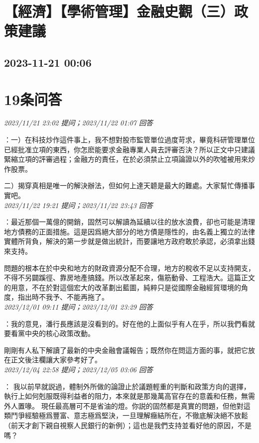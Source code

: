 \documentclass[twocolumn]{ctexart}
\begin{document}
\section{【經濟】【學術管理】金融史觀（三）政策建議}
\subsection{2023-11-21 00:06}


\section{19条问答}

\textit{\hfill\noindent\small 2023/11/21 23:02 提问；2023/11/22 01:07 回答}

：一）在科技炒作這件事上，我不想對股市監管單位過度苛求，畢竟科研管理單位已經批准立項的東西，你怎麽能要求金融專業人員去評審否決？所以正文中只建議緊縮立項的評審過程；金融方的責任，在於必須禁止立項論證以外的吹噓被用來炒作股票。

二）揭穿真相是唯一的解決辦法，但如何上達天聼是最大的難處。大家幫忙傳播事實吧。
\\

\textit{\hfill\noindent\small 2023/11/22 19:21 提问；2023/11/22 23:43 回答}

：最近那個一萬億的開銷，固然可以解讀為延續以往的放水浪費，卻也可能是清理地方債務的正面措施。這是因爲絕大部分的地方債是隱性的，由名義上獨立的法律實體所背負，解決的第一步就是做出統計，而要讓地方政府敢於承認，必須拿出錢來支持。

問題的根本在於中央和地方的財政資源分配不合理，地方的稅收不足以支持開支，不得不另闢蹊徑、靠房地產搞錢。所以改革起來，傷筋動骨、工程浩大。這篇正文的用意，不在於對這個宏大的改革劃出藍圖，純粹只是從國際金融經貿環境的角度，指出時不我予、不能再拖了。
\\

\textit{\hfill\noindent\small 2023/12/01 09:11 提问；2023/12/01 23:29 回答}

：我的意見，潘行長應該是沒看到的。好在他的上面似乎有人在乎，所以我們看就要看黨中央的核心政策改動。

剛剛有人私下解讀了最新的中央金融會議報告；既然你在問這方面的事，就把它放在正文後注欄讓大家參考好了。
\\

\textit{\hfill\noindent\small 2023/12/04 22:58 提问；2023/12/05 03:06 回答}

：
我以前早就説過，體制外所做的論證止於議題輕重的判斷和政策方向的選擇，執行上如何剋服既得利益者的阻力，本來就是那幾萬高官存在的意義和任務，無需外人置喙。
現任最高層可不是省油的燈。你説的固然都是真實的問題，但他對這類鬥爭經驗極爲豐富、意志極爲堅決，一旦理解癥結所在，不徹底解決絕不放鬆（前天才創下親自視察人民銀行的新例）；這也是我們支持並看好他的原因，不是嗎？
\\
\end{document}
